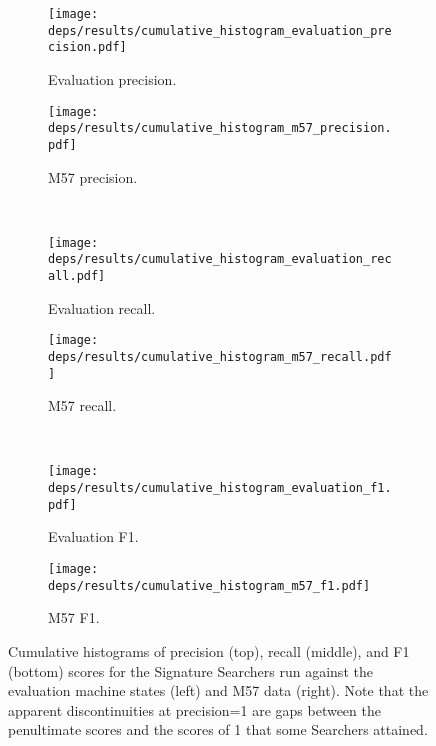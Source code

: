 \documentclass[11pt]{ucthesis}
\theoremstyle{plain}
\theoremstyle{definition}
\begin{document}
\begin{figure}
  \centering
  \begin{subfigure}[b]{0.49\textwidth}
    \texttt{[image: deps/results/cumulative\_histogram\_evaluation\_precision.pdf]}
    \caption{\label{fig:cumhist:evaluation:precision}Evaluation precision.}
  \end{subfigure}
  \begin{subfigure}[b]{0.49\textwidth}
    \texttt{[image: deps/results/cumulative\_histogram\_m57\_precision.pdf]}
    \caption{\label{fig:cumhist:m57:precision}M57 precision.}
  \end{subfigure}
  ~
  \begin{subfigure}[b]{0.49\textwidth}
    \texttt{[image: deps/results/cumulative\_histogram\_evaluation\_recall.pdf]}
    \caption{\label{fig:cumhist:evaluation:recall}Evaluation recall.}
  \end{subfigure}
  \begin{subfigure}[b]{0.49\textwidth}
    \texttt{[image: deps/results/cumulative\_histogram\_m57\_recall.pdf]}
    \caption{\label{fig:cumhist:m57:recall}M57 recall.}
  \end{subfigure}
  ~
  \begin{subfigure}[b]{0.49\textwidth}
    \texttt{[image: deps/results/cumulative\_histogram\_evaluation\_f1.pdf]}
    \caption{\label{fig:cumhist:evaluation:f1}Evaluation F1.}
  \end{subfigure}
  \begin{subfigure}[b]{0.49\textwidth}
    \texttt{[image: deps/results/cumulative\_histogram\_m57\_f1.pdf]}
    \caption{\label{fig:cumhist:m57:f1}M57 F1.}
  \end{subfigure}
  \caption{\label{fig:cumhist:all}Cumulative histograms of precision (top), recall (middle), and F1 (bottom) scores for the Signature Searchers run against the evaluation machine states (left) and M57 data (right).  Note that the apparent discontinuities at precision=1 are gaps between the penultimate scores and the scores of 1 that some Searchers attained.}
\end{figure}
\end{document}
